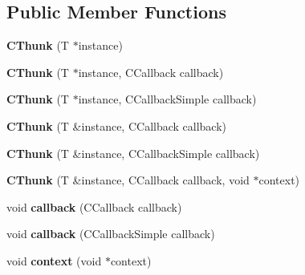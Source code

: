 \subsection*{Public Member Functions}
\begin{DoxyCompactItemize}
\item 
{\bfseries C\+Thunk} (T $\ast$instance)\hypertarget{class_c_thunk_a11e49294221b88fa82e2f8840b5d019b}{}\label{class_c_thunk_a11e49294221b88fa82e2f8840b5d019b}

\item 
{\bfseries C\+Thunk} (T $\ast$instance, C\+Callback callback)\hypertarget{class_c_thunk_adf513f25c9eafd626398e57611fb34d6}{}\label{class_c_thunk_adf513f25c9eafd626398e57611fb34d6}

\item 
{\bfseries C\+Thunk} (T $\ast$instance, C\+Callback\+Simple callback)\hypertarget{class_c_thunk_a6c290556bbae0a5726222f913940f19c}{}\label{class_c_thunk_a6c290556bbae0a5726222f913940f19c}

\item 
{\bfseries C\+Thunk} (T \&instance, C\+Callback callback)\hypertarget{class_c_thunk_a03e474f9cd7219f235e5c882f0df58c2}{}\label{class_c_thunk_a03e474f9cd7219f235e5c882f0df58c2}

\item 
{\bfseries C\+Thunk} (T \&instance, C\+Callback\+Simple callback)\hypertarget{class_c_thunk_abfeb17643d1d724eec8c1b2817e5287b}{}\label{class_c_thunk_abfeb17643d1d724eec8c1b2817e5287b}

\item 
{\bfseries C\+Thunk} (T \&instance, C\+Callback callback, void $\ast$context)\hypertarget{class_c_thunk_afa1896696ea945eb44f1a02c59e86923}{}\label{class_c_thunk_afa1896696ea945eb44f1a02c59e86923}

\item 
void {\bfseries callback} (C\+Callback callback)\hypertarget{class_c_thunk_a93023dcf8b5fa1b3f1582e74bc4606b6}{}\label{class_c_thunk_a93023dcf8b5fa1b3f1582e74bc4606b6}

\item 
void {\bfseries callback} (C\+Callback\+Simple callback)\hypertarget{class_c_thunk_a927b5c8d0570869d6a393add31b9306f}{}\label{class_c_thunk_a927b5c8d0570869d6a393add31b9306f}

\item 
void {\bfseries context} (void $\ast$context)\hypertarget{class_c_thunk_a8ba49cf7e851365b40eb086cee4be3ac}{}\label{class_c_thunk_a8ba49cf7e851365b40eb086cee4be3ac}


\end{DoxyCompactItemize}
